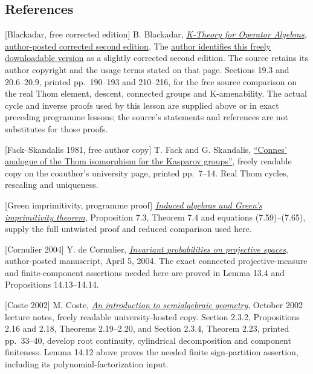 \documentclass[
  11pt,
]{article}
\begin{document}
\subsection{References}\label{references}

{[}Blackadar, free corrected edition{]} B. Blackadar,
\href{https://www.bruceblackadar.com/Mathematics/book6.pdf}{\emph{K-Theory
for Operator Algebras}, author-posted corrected second edition}. The
\href{https://www.bruceblackadar.com/mathpubs.html}{author identifies
this freely downloadable version} as a slightly corrected second
edition. The source retains its author copyright and the usage terms
stated on that page. Sections 19.3 and 20.6--20.9, printed pp.~190--193
and 210--216, for the free source comparison on the real Thom element,
descent, connected groups and K-amenability. The actual cycle and
inverse proofs used by this lesson are supplied above or in exact
preceding programme lessons; the source's statements and references are
not substitutes for those proofs.

{[}Fack--Skandalis 1981, free author copy{]} T. Fack and G. Skandalis,
\href{https://webusers.imj-prg.fr/~georges.skandalis/Publications/Publi1.pdf}{``Connes'
analogue of the Thom isomorphism for the Kasparov groups''}, freely
readable copy on the coauthor's university page, printed pp.~7--14. Real
Thom cycles, rescaling and uniqueness.

{[}Green imprimitivity, programme proof{]}
\href{https://kokunoyumeto.github.io/open-math-courses/courses/KT-CP/KT-CP-07.html}{\emph{Induced
algebras and Green's imprimitivity theorem}}, Proposition 7.3, Theorem
7.4 and equations (7.59)--(7.65), supply the full untwisted proof and
reduced comparison used here.

{[}Cornulier 2004{]} Y. de Cornulier,
\href{https://www.normalesup.org/~cornulier/invmean.pdf}{\emph{Invariant
probabilities on projective spaces}}, author-posted manuscript, April 5,
2004. The exact connected projective-measure and finite-component
assertions needed here are proved in Lemma 13.4 and Propositions
14.13--14.14.

{[}Coste 2002{]} M. Coste,
\href{https://blogs.mat.ucm.es/jesusr/wp-content/uploads/sites/52/2020/03/SAG.pdf}{\emph{An
introduction to semialgebraic geometry}}, October 2002 lecture notes,
freely readable university-hosted copy. Section 2.3.2, Propositions 2.16
and 2.18, Theorems 2.19--2.20, and Section 2.3.4, Theorem 2.23, printed
pp.~33--40, develop root continuity, cylindrical decomposition and
component finiteness. Lemma 14.12 above proves the needed finite
sign-partition assertion, including its polynomial-factorization input.
\end{document}

